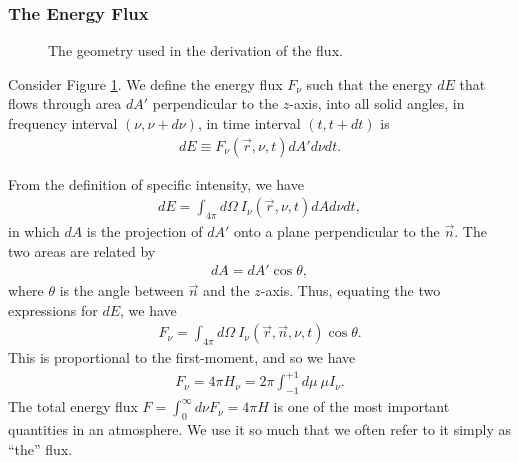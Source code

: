 \newslide

\subsubsection{The Energy Flux}

\begin{figure}
\begin{center}
\end{center}
\caption{The geometry used in the derivation of the flux.}
\label{fig-flux}
\end{figure}

Consider Figure \ref{fig-flux}. 
We define the energy flux $F_\nu$ such that the energy $dE$ that flows through area
$dA'$ perpendicular to the $z$-axis, into all solid angles, in frequency interval $(\nu,\nu+d\nu)$, in
time interval $(t,t+dt)$ is
\begin{align}
dE \equiv F_\nu(\vec r, \nu, t) dA' d\nu dt.
\end{align}

\newslide

From the definition of
specific intensity, 
we have
\begin{align}
dE = 
\int_{4\pi}\!\!\!d\Omega\:
I_\nu(\vec r, \nu, t) dA d\nu dt,
\end{align}
in which $dA$ is the projection of $dA'$ onto a plane perpendicular to the $\vec n$. 
The two areas
are related by
\begin{align}
dA = dA' \cos\theta,
\end{align}
where $\theta$ is the angle between $\vec n$ and the
$z$-axis. Thus, equating the two expressions for $dE$, we have
\begin{align}
F_\nu = \int_{4\pi}\!\!\!d\Omega\:
I_\nu(\vec r, \vec n, \nu, t) \cos\theta.
\end{align}
This is proportional to the first-moment, and so we have
\begin{align}
F_\nu = 4\pi H_\nu =
2\pi \int_{-1}^{+1}\!\!\!d\mu\:\mu I_\nu.
\end{align}
The total energy flux $F = \int_0^\infty\!\!\!d\nu F_\nu = 4\pi H$ is
one of the most important quantities in an atmosphere. We use it so much that we often refer to it simply as ``the'' flux.

